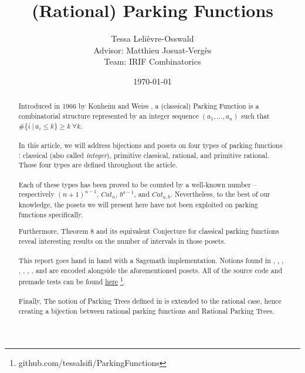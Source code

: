 \documentclass[12pt]{report}
\begin{document}
\title{(Rational) Parking Functions}
\author{Tessa Lelièvre-Osswald\\
    {\small Advisor: Matthieu Josuat-Vergès}\\
    {\small Team: IRIF Combinatorics}}
\date{\today}

\maketitle

\begin{abstract}
    \paragraph{} Introduced in 1966 by Konheim and Weiss
    \cite{ref1}, a (classical) Parking Function is a
    combinatorial structure represented by an integer
    sequence $(a_1, \ldots, a_n)$ such that
    $\#\{i\ |\ a_i \leqslant k\} \geqslant k\ \forall k$.

    \paragraph{} In this article, we will address bijections
    and posets on four types of parking functions :
    classical (also called \emph{integer}), primitive classical,
    rational, and primitive rational.
    Those four types are defined throughout the article.
    
    \paragraph{} Each of these types has been proved
    to be counted by a well-known number -- respectively 
    $(n+1)^{n-1}$, $Cat_n$, $b^{a-1}$, and $Cat_{a,b}$.
    Nevertheless, to the best of our knowledge, the posets
    we will present here have not been exploited on parking
    functions specifically.

    Furthermore, Theorem 8 and its equivalent Conjecture for
    classical parking functions reveal interesting results on
    the number of intervals in those posets.

    \paragraph{} This report goes hand in hand with a Sagemath
    implementation. Notions found in \cite{ref2}, \cite{ref3},
    \cite{ref4}, \cite{ref5}, \cite{ref6}, \cite{ref7},
    \cite{ref8}, and \cite{ref9} are encoded alongside the
    aforementioned posets.
    All of the source code and premade tests can be found
    \href{https://github.com/tessalsifi/ParkingFunctions}{here}
    \footnote{github.com/tessalsifi/ParkingFunctions}.

    \paragraph{} Finally, The notion of Parking Trees defined
    in \cite{ref9} is extended to the rational case, hence
    creating a bijection between rational parking functions and
    Rational Parking Trees.

\end{abstract}
\end{document}
